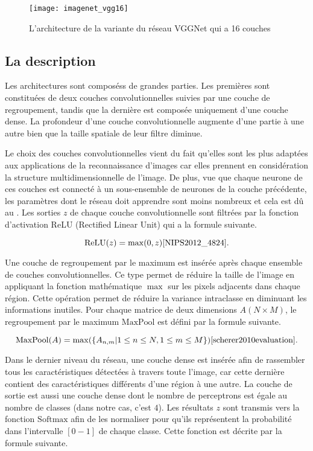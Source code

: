 \begin{figure}[h]
\begin{center}
\texttt{[image: imagenet\_vgg16]}
\caption{L'architecture de la variante du réseau VGGNet qui a 16 couches \cite{blier2016abrief}}
\end{center}
\end{figure}

\subsection{La description}

Les architectures sont composéss de grandes parties. Les premières sont
constituées de deux couches convolutionnelles suivies par une couche de regroupement,
tandis que la dernière est composée uniquement d'une couche dense. La
profondeur d'une couche convolutionnelle augmente d'une partie à une autre
bien que la taille spatiale de leur filtre diminue.

Le choix des couches convolutionnelles vient du fait qu'elles sont les plus
adaptées aux applications de la reconnaissance d'images car elles prennent en
considération la structure multidimensionnelle de l'image. De plus, vue que
chaque neurone de ces couches est connecté à un sous-ensemble de neurones de la
couche précédente, les paramètres dont le réseau doit apprendre sont moins nombreux et cela
est dû au . Les sorties $z$ de chaque couche
convolutionnelle sont filtrées par la fonction d'activation ReLU (Rectified Linear Unit)
qui a la formule suivante.

$$
\mathrm{ReLU}(z) = \max(0,z) \cite{NIPS2012_4824}.
$$

Une couche de regroupement par le maximum est insérée après chaque ensemble de couches
convolutionnelles. Ce type permet de réduire la taille de l'image en appliquant
la fonction mathématique $\max$ sur les pixels adjacents dans chaque région. Cette
opération permet de réduire la variance intraclasse en diminuant les informations
inutiles. Pour chaque matrice de deux dimensions $A(N \times M)$, le regroupement
par le maximum $\mathrm{MaxPool}$ est défini par la formule suivante.

$$
\mathrm{MaxPool}(A) = \max(\{A_{n,m} | 1 \leq n \leq N, 1 \leq m \leq M\}) \cite{scherer2010evaluation}.
$$

Dans le dernier niveau du réseau, une couche dense est insérée afin de
rassembler tous les caractéristiques détectées à travers toute l'image, car cette
dernière contient des caractéristiques différents d'une région à une autre.
La couche de sortie est aussi une couche dense dont le nombre de perceptrons est
égale au nombre de classes (dans notre cas, c'est $4$). Les résultats $z$ sont
transmis vers la fonction $\mathrm{Softmax}$ afin de les normaliser pour
qu'ils représentent la probabilité dans l'intervalle $[0-1]$ de chaque classe.
Cette fonction est décrite par la formule suivante.

